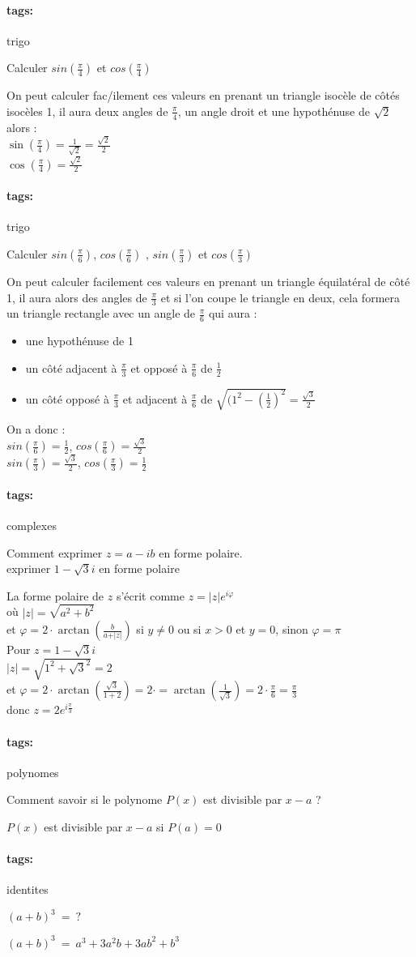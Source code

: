 \documentclass[12pt]{article}
\newcommand*{\xfield}[1]{\begin{mdframed}\centering #1\end{mdframed}\bigskip}
\newenvironment{note}{}{}
\newcommand*{\tags}[1]{\paragraph{tags: }#1}
\begin{document}
\begin{note}
	\tags{trigo}
	\xfield{Calculer $sin(\frac{\pi}{4})$ et $cos(\frac{\pi}{4})$}
	\xfield{On peut calculer fac/ilement ces valeurs en prenant un triangle isocèle de côtés isocèles 1, il aura deux angles de $\frac{\pi}{4}$, un angle droit et une hypothénuse de $\sqrt{2}$ alors : \\
	$\sin(\frac{\pi}{4}) = \frac{1}{\sqrt{2}} = \frac{\sqrt{2}}{2}$\\
	$\cos(\frac{\pi}{4}) = \frac{\sqrt{2}}{2}$}
\end{note}
\begin{note}
	\tags{trigo}
	\xfield{Calculer
$sin(\frac{\pi}{6})$,  $cos(\frac{\pi}{6})$ , $sin(\frac{\pi}{3})$ et $cos(\frac{\pi}{3})$}
	\xfield{On peut calculer facilement ces valeurs en prenant un triangle équilatéral de côté 1, il aura alors des angles de $\frac{\pi}{3}$ et si l'on coupe le triangle en deux, cela formera un triangle rectangle avec un angle de $\frac{\pi}{6}$ qui aura :
	\begin{itemize}
	\item une hypothénuse de 1
	\item  un côté adjacent à $\frac{\pi}{3}$ et opposé à $\frac{\pi}{6}$ de $\frac{1}{2}$
	\item un côté opposé à $\frac{\pi}{3}$ et adjacent à $\frac{\pi}{6}$ de $\sqrt{(1^2-(\frac{1}{2})^2} = \frac{\sqrt{3}}{2}$
	\end{itemize}
	On a donc :\\
	$sin(\frac{\pi}{6}) = \frac{1}{2}$, $cos(\frac{\pi}{6}) = \frac{\sqrt{3}}{2}$ \\
	$sin(\frac{\pi}{3}) = \frac{\sqrt{3}}{2}$, $cos(\frac{\pi}{3}) = \frac{1}{2}$}
\end{note}
\begin{note}
	\tags{complexes}
	\xfield{Comment exprimer $z=a-ib$ en forme polaire.
	\\exprimer $1-\sqrt{3}i$ en forme polaire}
	\xfield{La forme polaire de $z$ s'écrit comme $z= \vert z \vert e^{i \varphi}$ \\
	où $\vert z \vert = \sqrt{a^2+b^2}$\\
	et $\varphi = 2 \cdot \arctan(\frac{b}{a+\vert z \vert})$ si $y \neq 0$ ou si $x > 0$ et $y = 0$, sinon $\varphi = \pi$\\
	Pour $z = 1-\sqrt{3}i$\\
	$\vert z \vert = \sqrt{1^2+\sqrt{3}^2} = 2$\\
	et $\varphi =  2 \cdot \arctan(\frac{\sqrt{3}}{1+2}) = 2 \cdot = \arctan(\frac{1}{\sqrt{3}})=2 \cdot \frac{\pi}{6} = \frac{\pi}{3}$\\
	donc $z= 2 e^{i \frac{\pi}{3}}$}
\end{note}
\begin{note}
	\tags{polynomes}
    \xfield{Comment savoir si le polynome $P(x)$ est divisible par $x - a$ ? }
    \xfield{$P(x)$ est divisible par $x-a$ si $P(a) = 0$}
\end{note}
\begin{note}
	\tags{identites}
    \xfield{$(a+b)^3\ =\ ?$}
    \xfield{$(a+b)^3\ =\ a^3 + 3a^2b+3ab^2+b^3$}
\end{note}
\end{document}
